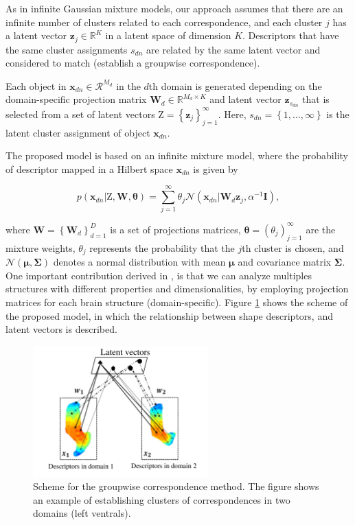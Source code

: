 \documentclass[]{article}
\newcommand{\Z}{\boldsymbol{\mathrm{Z}}}
\newcommand{\indobj}{\mathbf{x}_{dn}}
\newcommand{\projMatI}{\mathbf{W}_d}
\newcommand{\lvecI}{\mathbf{z}_j}
\newcommand{\lvecsI}{\mathbf{z}_{s_{dn}}}
\begin{document}
As in infinite Gaussian mixture models, our approach assumes that there are an infinite number of clusters related to each
correspondence, and each cluster $j$ has a latent vector $\lvecI\in \mathbb{R}^K$ in a latent space of dimension $K$. Descriptors that have the same cluster assignments $s_{dn}$ are related by the same latent vector and considered to match (establish a groupwise correspondence).

Each object in $\indobj \in \mathcal{R}^{M_d}$ in the $d$th domain is generated depending on the domain-specific projection matrix $\projMatI \in \mathbb{R}^{M_d \times K}$ and latent vector $\lvecsI$ that is selected from a set of latent vectors $\Z = \left\{\lvecI\right\}_{j=1}^\infty$. Here, $s_{dn}=\left\{1,\dots,\infty\right\}$ is the latent cluster assignment of object $\indobj$.


The proposed model is based on an infinite mixture model, where the
probability of descriptor mapped in a Hilbert space $\indobj$ is given by

\begin{equation}
p\left( {{\indobj}|{\Z},{\boldsymbol{{W}}},{\boldsymbol{\theta }}} \right) = \sum\limits_{j = 1}^\infty  {{\theta _j}\mathcal{N}\left(\indobj|\projMatI\lvecI,\alpha^{-1}\mathbf{I}\right)}, 
\label{eq:llNLmodel}
\end{equation}

where $\boldsymbol{{W}} = \left\{\projMatI \right\}_{d=1}^{D}$ is a set of projections
matrices, $\boldsymbol{\theta}=\left(\theta_j\right)_{j=1}^{\infty}$
are the mixture weights, $\theta_j$ represents the probability that
the $j$th cluster is chosen, and
$\mathcal{N}\left(\boldsymbol{\mu},\boldsymbol{\Sigma}\right)$ denotes
a normal distribution with mean $\boldsymbol{\mu}$ and covariance
matrix $\boldsymbol{\Sigma}$. One important contribution derived in \cite{Iwata13}, is that we can analyze multiples structures with different properties and dimensionalities, by employing projection matrices for each brain structure (domain-specific). Figure
\ref{fig:pipeline} shows the scheme of the proposed model, in which
the relationship between shape descriptors, and
latent vectors is described.

\begin{figure}[h!]
\centering
\includegraphics[width=0.6\textwidth]{img/pipelineGroupCorr}
\caption{Scheme for the groupwise correspondence method. The
  figure shows an example of establishing clusters of correspondences
  in two domains (left ventrals).}
\label{fig:pipeline}
\end{figure} 
\end{document}
